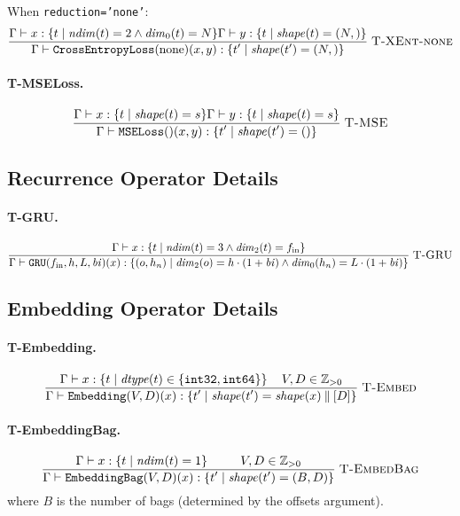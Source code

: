 \documentclass[10pt]{article}
\newcommand{\typerule}[3]{%
  \frac{\displaystyle #2}{\displaystyle #3}
  \;\textsc{#1}%
}
\theoremstyle{plain}
\theoremstyle{definition}
\theoremstyle{remark}
\begin{document}
\noindent
When \texttt{reduction='none'}:
\[
\typerule{T-XEnt-none}{\Gamma \vdash x : \{t \mid \mathit{ndim}(t) = 2 \land
    \mathit{dim}_0(t) = N\} \\
   \Gamma \vdash y : \{t \mid \mathit{shape}(t) = (N,)\}}{\Gamma \vdash \texttt{CrossEntropyLoss}(\text{none})(x, y) :
    \{t' \mid \mathit{shape}(t') = (N,)\}}
\]

\paragraph{T-MSELoss.}
\[
\typerule{T-MSE}{\Gamma \vdash x : \{t \mid \mathit{shape}(t) = s\} \\
   \Gamma \vdash y : \{t \mid \mathit{shape}(t) = s\}}{\Gamma \vdash \texttt{MSELoss}()(x, y) :
    \{t' \mid \mathit{shape}(t') = ()\}}
\]

\subsection{Recurrence Operator Details}

\paragraph{T-GRU.}
\[
\typerule{T-GRU}{\Gamma \vdash x : \{t \mid \mathit{ndim}(t) = 3 \land
    \mathit{dim}_2(t) = f_\text{in}\}}{\Gamma \vdash \texttt{GRU}(f_\text{in}, h, L, \mathit{bi})(x) :
    \{(o, h_n) \mid \mathit{dim}_2(o) = h \cdot (1 + \mathit{bi}) \land
    \mathit{dim}_0(h_n) = L \cdot (1 + \mathit{bi})\}}
\]

\subsection{Embedding Operator Details}

\paragraph{T-Embedding.}
\[
\typerule{T-Embed}{\Gamma \vdash x : \{t \mid \mathit{dtype}(t) \in
    \{\texttt{int32}, \texttt{int64}\}\} \\
   V, D \in \mathbb{Z}_{>0}}{\Gamma \vdash \texttt{Embedding}(V, D)(x) :
    \{t' \mid \mathit{shape}(t') = \mathit{shape}(x) \mathbin\| [D]\}}
\]

\paragraph{T-EmbeddingBag.}
\[
\typerule{T-EmbedBag}{\Gamma \vdash x : \{t \mid \mathit{ndim}(t) = 1\} \\
   V, D \in \mathbb{Z}_{>0}}{\Gamma \vdash \texttt{EmbeddingBag}(V, D)(x) :
    \{t' \mid \mathit{shape}(t') = (B, D)\}}
\]
where $B$ is the number of bags (determined by the offsets argument).
\end{document}
